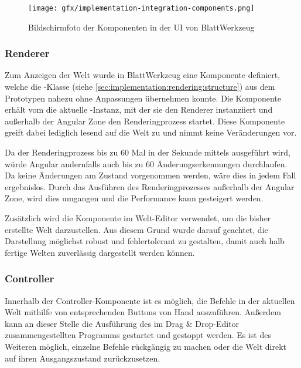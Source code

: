 \begin{figure}
  \centering
  \texttt{[image: gfx/implementation-integration-components.png]}
  \caption{Bildschirmfoto der Komponenten in der UI von BlattWerkzeug}
  \label{fig:implementation:integration:components}
\end{figure}

\subsubsection{Renderer}
\label{sec:implementation:integration:renderer}

Zum Anzeigen der Welt wurde in BlattWerkzeug eine Komponente definiert, welche die -Klasse (siehe \ref{sec:implementation:rendering:structure}) aus dem Prototypen nahezu ohne Anpassungen übernehmen konnte. Die Komponente erhält vom  die aktuelle -Instanz, mit der sie den Renderer instanziiert und außerhalb der Angular Zone den Renderingprozess startet. Diese Komponente greift dabei lediglich lesend auf die Welt zu und nimmt keine Veränderungen vor.

Da der Renderingprozess bis zu 60 Mal in der Sekunde mittels  ausgeführt wird, würde Angular andernfalls auch bis zu 60 Änderungserkennungen durchlaufen. Da keine Änderungen am Zustand vorgenommen werden, wäre dies in jedem Fall ergebnislos. Durch das Ausführen des Renderingprozesses außerhalb der Angular Zone, wird dies umgangen und die Performance kann gesteigert werden.

Zusätzlich wird die Komponente im Welt-Editor verwendet, um die bisher erstellte Welt darzustellen. Aus diesem Grund wurde darauf geachtet, die Darstellung möglichst robust und fehlertolerant zu gestalten, damit auch halb fertige Welten zuverlässig dargestellt werden können.

\subsubsection{Controller}
\label{sec:implementation:integration:controller}

Innerhalb der Controller-Komponente ist es möglich, die Befehle in der aktuellen Welt mithilfe von entsprechenden Buttons von Hand auszuführen. Außerdem kann an dieser Stelle die Ausführung des im Drag \& Drop-Editor zusammengestellten Programms gestartet und gestoppt werden. Es ist des Weiteren möglich, einzelne Befehle rückgängig zu machen oder die Welt direkt auf ihren Ausgangszustand zurückzusetzen.

